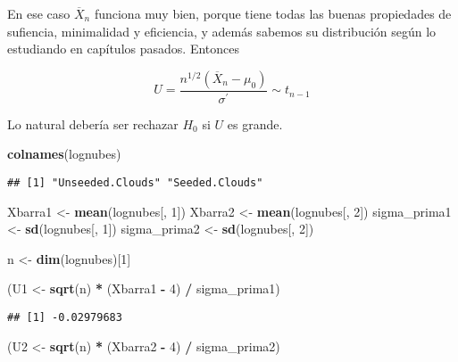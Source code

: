 \documentclass[
  12pt,
]{book}
\newenvironment{Shaded}{\begin{snugshade}}{\end{snugshade}}
\newcommand{\DecValTok}[1]{\textcolor[rgb]{0.00,0.00,0.81}{#1}}
\newcommand{\KeywordTok}[1]{\textcolor[rgb]{0.13,0.29,0.53}{\textbf{#1}}}
\newcommand{\NormalTok}[1]{#1}
\newcommand{\OperatorTok}[1]{\textcolor[rgb]{0.81,0.36,0.00}{\textbf{#1}}}
\newcommand{\StringTok}[1]{\textcolor[rgb]{0.31,0.60,0.02}{#1}}
\begin{document}
En ese caso \(\overline{X}_{n}\) funciona muy bien, porque tiene todas las
buenas propiedades de sufiencia, minimalidad y eficiencia, y además sabemos su
distribución según lo estudiando en capítulos pasados. Entonces

\begin{equation*}
U = \frac{n ^{1/2} (\overline{X}_{n} - \mu_0)}{\sigma^\prime} \sim t_{n-1}
\end{equation*}

Lo natural debería ser rechazar \(H_{0}\) si \(U\) es grande.

\begin{Shaded}
\begin{Highlighting}[]
\KeywordTok{colnames}\NormalTok{(lognubes)}
\end{Highlighting}
\end{Shaded}

\begin{verbatim}
## [1] "Unseeded.Clouds" "Seeded.Clouds"
\end{verbatim}

\begin{Shaded}
\begin{Highlighting}[]
\NormalTok{Xbarra1 \textless{}{-}}\StringTok{ }\KeywordTok{mean}\NormalTok{(lognubes[, }\DecValTok{1}\NormalTok{])}
\NormalTok{Xbarra2 \textless{}{-}}\StringTok{ }\KeywordTok{mean}\NormalTok{(lognubes[, }\DecValTok{2}\NormalTok{])}
\NormalTok{sigma\_prima1 \textless{}{-}}\StringTok{ }\KeywordTok{sd}\NormalTok{(lognubes[, }\DecValTok{1}\NormalTok{])}
\NormalTok{sigma\_prima2 \textless{}{-}}\StringTok{ }\KeywordTok{sd}\NormalTok{(lognubes[, }\DecValTok{2}\NormalTok{])}

\NormalTok{n \textless{}{-}}\StringTok{ }\KeywordTok{dim}\NormalTok{(lognubes)[}\DecValTok{1}\NormalTok{]}


\NormalTok{(U1 \textless{}{-}}\StringTok{ }\KeywordTok{sqrt}\NormalTok{(n) }\OperatorTok{*}\StringTok{ }\NormalTok{(Xbarra1 }\OperatorTok{{-}}\StringTok{ }\DecValTok{4}\NormalTok{) }\OperatorTok{/}\StringTok{ }\NormalTok{sigma\_prima1)}
\end{Highlighting}
\end{Shaded}

\begin{verbatim}
## [1] -0.02979683
\end{verbatim}

\begin{Shaded}
\begin{Highlighting}[]
\NormalTok{(U2 \textless{}{-}}\StringTok{ }\KeywordTok{sqrt}\NormalTok{(n) }\OperatorTok{*}\StringTok{ }\NormalTok{(Xbarra2 }\OperatorTok{{-}}\StringTok{ }\DecValTok{4}\NormalTok{) }\OperatorTok{/}\StringTok{ }\NormalTok{sigma\_prima2)}
\end{Highlighting}
\end{Shaded}
\end{document}
